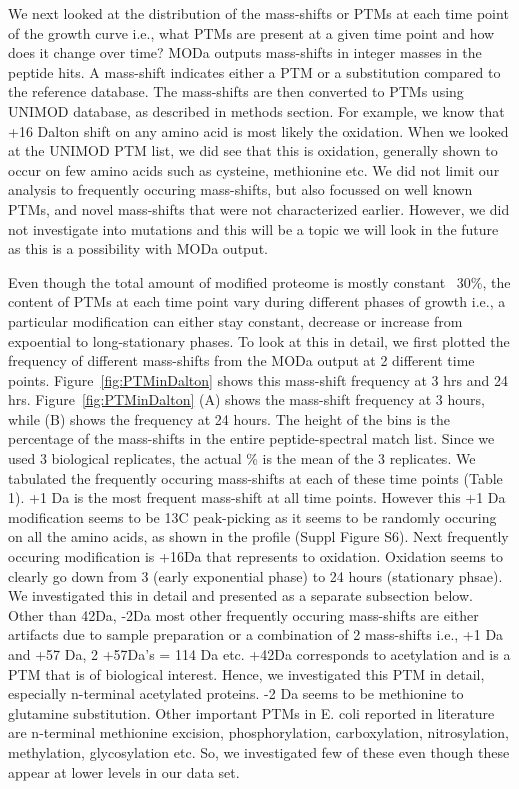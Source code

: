 \documentclass[12pt]{article}
\begin{document}
We next looked at the distribution of the mass-shifts or PTMs at each time point of the growth curve i.e., what PTMs are present at a given time point and how does it change over time? MODa outputs mass-shifts in integer masses in the peptide hits. A mass-shift indicates either a PTM or a substitution compared to the reference database. The mass-shifts are then converted to PTMs using UNIMOD database, as described in methods section. For example, we know that +16 Dalton shift on any amino acid is most likely the oxidation. When we looked at the UNIMOD PTM list, we did see that this is oxidation, generally shown to occur on few amino acids such as cysteine, methionine etc. We did not limit our analysis to frequently occuring mass-shifts, but also focussed on well known PTMs, and novel mass-shifts that were not characterized earlier. However, we did not investigate into mutations and this will be a topic we will look in the future as this is a possibility with MODa output.

Even though the total amount of modified proteome is mostly constant ~30\%, the content of PTMs at each time point vary during different phases of growth i.e., a particular modification can either stay constant, decrease or increase from expoential to long-stationary phases. To look at this in detail, we first plotted the frequency of different mass-shifts from the MODa output at 2 different time points. Figure~\ref{fig:PTMinDalton} shows this mass-shift frequency at 3 hrs and 24 hrs. Figure~\ref{fig:PTMinDalton} (A) shows the mass-shift frequency at 3 hours, while (B) shows the frequency at 24 hours. The height of the bins is the percentage of the mass-shifts in the entire peptide-spectral match list. Since we used 3 biological replicates, the actual \% is the mean of the 3 replicates. We tabulated the frequently occuring mass-shifts at each of these time points (Table 1). +1 Da is the most frequent mass-shift at all time points. However this +1 Da modification seems to be 13C peak-picking as it seems to be randomly occuring on all the amino acids, as shown in the profile (Suppl Figure S6). Next frequently occuring modification is +16Da that represents to oxidation. Oxidation seems to clearly go down from 3 (early exponential phase) to 24 hours (stationary phsae). We investigated this in detail and presented as a separate subsection below. Other than 42Da, -2Da most other frequently occuring mass-shifts are either artifacts due to sample preparation or a combination of 2 mass-shifts i.e., +1 Da and +57 Da, 2 +57Da's = 114 Da etc. +42Da corresponds to acetylation and is a PTM that is of biological interest. Hence, we investigated this PTM in detail, especially n-terminal acetylated proteins. -2 Da seems to be methionine to glutamine substitution. Other important PTMs in E. coli reported in literature are n-terminal methionine excision, phosphorylation, carboxylation, nitrosylation, methylation, glycosylation etc. So, we investigated few of these even though these appear at lower levels in our data set.
\end{document}

